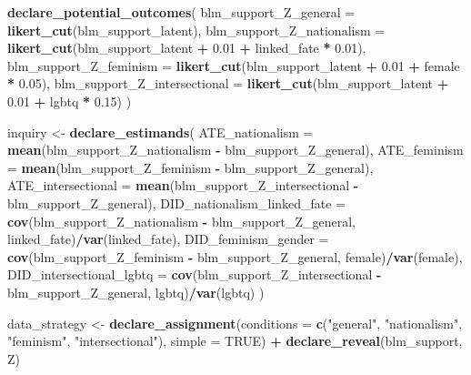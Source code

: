 \documentclass[
]{article}
\newenvironment{Shaded}{\begin{snugshade}}{\end{snugshade}}
\newcommand{\DataTypeTok}[1]{\textcolor[rgb]{0.13,0.29,0.53}{#1}}
\newcommand{\FloatTok}[1]{\textcolor[rgb]{0.00,0.00,0.81}{#1}}
\newcommand{\KeywordTok}[1]{\textcolor[rgb]{0.13,0.29,0.53}{\textbf{#1}}}
\newcommand{\NormalTok}[1]{#1}
\newcommand{\OperatorTok}[1]{\textcolor[rgb]{0.81,0.36,0.00}{\textbf{#1}}}
\newcommand{\OtherTok}[1]{\textcolor[rgb]{0.56,0.35,0.01}{#1}}
\newcommand{\StringTok}[1]{\textcolor[rgb]{0.31,0.60,0.02}{#1}}
\begin{document}
\begin{Shaded}
\begin{Highlighting}[]
\StringTok{  }\KeywordTok{declare_potential_outcomes}\NormalTok{(}
    \DataTypeTok{blm_support_Z_general =} \KeywordTok{likert_cut}\NormalTok{(blm_support_latent),}
    \DataTypeTok{blm_support_Z_nationalism =} \KeywordTok{likert_cut}\NormalTok{(blm_support_latent }\OperatorTok{+}\StringTok{ }\FloatTok{0.01} \OperatorTok{+}\StringTok{ }\NormalTok{linked_fate }\OperatorTok{*}\StringTok{ }\FloatTok{0.01}\NormalTok{),}
    \DataTypeTok{blm_support_Z_feminism =} \KeywordTok{likert_cut}\NormalTok{(blm_support_latent }\OperatorTok{+}\StringTok{ }\FloatTok{0.01} \OperatorTok{+}\StringTok{ }\NormalTok{female }\OperatorTok{*}\StringTok{ }\FloatTok{0.05}\NormalTok{),}
    \DataTypeTok{blm_support_Z_intersectional =} \KeywordTok{likert_cut}\NormalTok{(blm_support_latent }\OperatorTok{+}\StringTok{ }\FloatTok{0.01} \OperatorTok{+}\StringTok{ }\NormalTok{lgbtq }\OperatorTok{*}\StringTok{ }\FloatTok{0.15}\NormalTok{)}
\NormalTok{  )}

\NormalTok{inquiry <-}\StringTok{  }
\StringTok{  }\KeywordTok{declare_estimands}\NormalTok{(}
    \DataTypeTok{ATE_nationalism =} \KeywordTok{mean}\NormalTok{(blm_support_Z_nationalism }\OperatorTok{-}\StringTok{ }\NormalTok{blm_support_Z_general),}
    \DataTypeTok{ATE_feminism =} \KeywordTok{mean}\NormalTok{(blm_support_Z_feminism }\OperatorTok{-}\StringTok{ }\NormalTok{blm_support_Z_general),}
    \DataTypeTok{ATE_intersectional =} \KeywordTok{mean}\NormalTok{(blm_support_Z_intersectional }\OperatorTok{-}\StringTok{ }\NormalTok{blm_support_Z_general),}
    \DataTypeTok{DID_nationalism_linked_fate =} 
      \KeywordTok{cov}\NormalTok{(blm_support_Z_nationalism }\OperatorTok{-}\StringTok{ }\NormalTok{blm_support_Z_general, linked_fate)}\OperatorTok{/}\KeywordTok{var}\NormalTok{(linked_fate),}
    \DataTypeTok{DID_feminism_gender =} 
      \KeywordTok{cov}\NormalTok{(blm_support_Z_feminism }\OperatorTok{-}\StringTok{ }\NormalTok{blm_support_Z_general, female)}\OperatorTok{/}\KeywordTok{var}\NormalTok{(female),}
    \DataTypeTok{DID_intersectional_lgbtq =} 
      \KeywordTok{cov}\NormalTok{(blm_support_Z_intersectional }\OperatorTok{-}\StringTok{ }\NormalTok{blm_support_Z_general, lgbtq)}\OperatorTok{/}\KeywordTok{var}\NormalTok{(lgbtq)}
\NormalTok{  )}
\end{Highlighting}
\end{Shaded}

\begin{Shaded}
\begin{Highlighting}[]
\NormalTok{data_strategy <-}\StringTok{ }
\StringTok{  }\KeywordTok{declare_assignment}\NormalTok{(}\DataTypeTok{conditions =} \KeywordTok{c}\NormalTok{(}\StringTok{"general"}\NormalTok{, }\StringTok{"nationalism"}\NormalTok{, }\StringTok{"feminism"}\NormalTok{, }\StringTok{"intersectional"}\NormalTok{), }\DataTypeTok{simple =} \OtherTok{TRUE}\NormalTok{) }\OperatorTok{+}\StringTok{ }
\StringTok{  }\KeywordTok{declare_reveal}\NormalTok{(blm_support, Z) }
\end{Highlighting}
\end{Shaded}
\end{document}
